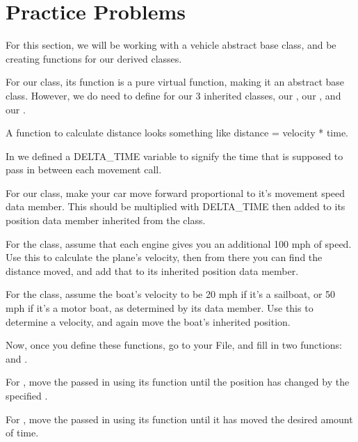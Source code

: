 \documentclass{tufte-handout}
\begin{document}
\section{Practice Problems}
For this section, we will be working with a vehicle abstract base class, and be creating functions for our derived classes.

For our  class, its  function is a pure virtual function, making it an abstract base class.
However, we do need to define  for our 3 inherited classes, our , our , and our .

A function to calculate distance looks something like distance = velocity * time.

In  we defined a DELTA\_TIME variable to signify the time that is supposed to pass in between each movement call.


For our  class, make your car move forward proportional to it's movement speed data member.
This should be multiplied with DELTA\_TIME then added to its position data member inherited from the  class.

For the  class, assume that each engine gives you an additional 100 mph of speed.
Use this to calculate the plane's velocity, then from there you can find the distance moved, and add that to its inherited position data member.

For the  class, assume the boat's velocity to be 20 mph if it's a sailboat, or 50 mph if it's a motor boat, as determined by its  data member.
Use this to determine a velocity, and again move the boat's inherited position.


Now, once you define these functions, go to your  File, and fill in two functions:
 and .

For , move the  passed in using its  function until the position has changed by the specified .

For , move the  passed in using its  function until it has moved the desired amount of time.
\end{document}
